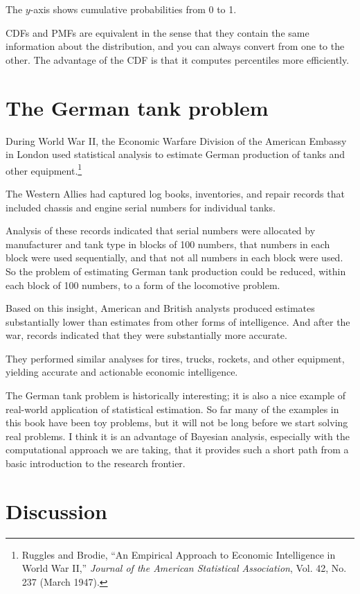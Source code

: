 \documentclass[12pt]{book}
\theoremstyle{exercise}
\begin{document}
The $y$-axis shows cumulative probabilities from 0 to 1.

CDFs and PMFs are equivalent in the sense that they contain the
same information about the distribution, and you can always convert
from one to the other.  
The advantage of the CDF is that it computes percentiles more efficiently.

\section{The German tank problem}

During World War II, the Economic Warfare Division of the American
Embassy in London used statistical analysis to estimate German
production of tanks and other equipment.\footnote{Ruggles and Brodie,
  ``An Empirical Approach to Economic Intelligence in World War II,''
  {\em Journal of the American Statistical Association}, Vol. 42,
  No. 237 (March 1947).}

The Western Allies had captured log books, inventories, and repair
records that included chassis and engine serial numbers for individual
tanks.

Analysis of these records indicated that serial numbers were allocated
by manufacturer and tank type in blocks of 100 numbers, that numbers
in each block were used sequentially, and that not all numbers in each
block were used.  So the problem of estimating German tank production
could be reduced, within each block of 100 numbers, to a form of the
locomotive problem.

Based on this insight, American and British analysts produced
estimates substantially lower than estimates from other forms
of intelligence.  And after the war, records indicated that they were
substantially more accurate.

They performed similar analyses for tires, trucks, rockets, and other
equipment, yielding accurate and actionable economic intelligence.

The German tank problem is historically interesting; it is also a nice
example of real-world application of statistical estimation.  So far
many of the examples in this book have been toy problems, but it will
not be long before we start solving real problems.  I think it is an
advantage of Bayesian analysis, especially with the computational
approach we are taking, that it provides such a short path from a
basic introduction to the research frontier.


\section{Discussion}
\end{document}

